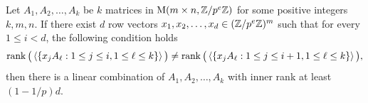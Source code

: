 \begin{lemma}\label{lem:space_dim_prelim}
Let $A_1, A_2, \dots, A_k$ be $k$ matrices in $\mathrm{M}(m\times n, \mathbb{Z} / p^e \mathbb{Z})$ for some positive integers $k, m, n$. 
If there exist $d$ row vectors
 $x_1, x_2, \dots, x_d \in ( \mathbb{Z} / p^e \mathbb{Z})^m$ such that for every $1 \leq i < d$, 
the following condition holds
\begin{align}\label{equ:rank_bound}
\rank\big(\left\langle \left\{x_j A_\ell : 1 \leq j \leq i, 1 \leq \ell \leq k\right\}\right\rangle \big) \neq \rank\big(\left\langle \left\{x_j A_\ell : 1 \leq j \leq i + 1, 1 \leq \ell \leq k\right\} \right\rangle\big),
\end{align}
then there is a linear combination of $A_1, A_2, \dots, A_k$ with inner rank at least $(1 - 1 / p)d$.
\end{lemma}
